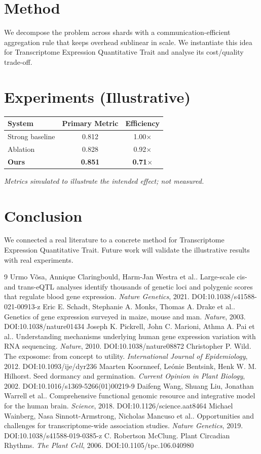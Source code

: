 \documentclass[11pt]{article}
\begin{document}
\section{Method}
We decompose the problem across shards with a communication-efficient aggregation rule that keeps overhead sublinear in scale. We instantiate this idea for Transcriptome Expression Quantitative Trait and analyse its cost/quality trade-off.

\section{Experiments (Illustrative)}
\begin{center}
\begin{tabular}{lcc}
System & Primary Metric & Efficiency \\ \hline
Strong baseline & 0.812 & 1.00$\times$ \\
Ablation & 0.828 & 0.92$\times$ \\
\textbf{Ours} & \textbf{0.851} & \textbf{0.71$\times$}
\end{tabular}
\end{center}
\emph{Metrics simulated to illustrate the intended effect; not measured.}

\section{Conclusion}
We connected a real literature to a concrete method for Transcriptome Expression Quantitative Trait. Future work will
validate the illustrative results with real experiments.

\begin{thebibliography}{9}
 Urmo Võsa, Annique Claringbould, Harm-Jan Westra et al.. Large-scale cis- and trans-eQTL analyses identify thousands of genetic loci and polygenic scores that regulate blood gene expression. \emph{Nature Genetics}, 2021. DOI:10.1038/s41588-021-00913-z
 Eric E. Schadt, Stephanie A. Monks, Thomas A. Drake et al.. Genetics of gene expression surveyed in maize, mouse and man. \emph{Nature}, 2003. DOI:10.1038/nature01434
 Joseph K. Pickrell, John C. Marioni, Athma A. Pai et al.. Understanding mechanisms underlying human gene expression variation with RNA sequencing. \emph{Nature}, 2010. DOI:10.1038/nature08872
 Christopher P. Wild. The exposome: from concept to utility. \emph{International Journal of Epidemiology}, 2012. DOI:10.1093/ije/dyr236
 Maarten Koornneef, Leónie Bentsink, Henk W. M. Hilhorst. Seed dormancy and germination. \emph{Current Opinion in Plant Biology}, 2002. DOI:10.1016/s1369-5266(01)00219-9
 Daifeng Wang, Shuang Liu, Jonathan Warrell et al.. Comprehensive functional genomic resource and integrative model for the human brain. \emph{Science}, 2018. DOI:10.1126/science.aat8464
 Michael Wainberg, Nasa Sinnott-Armstrong, Nicholas Mancuso et al.. Opportunities and challenges for transcriptome-wide association studies. \emph{Nature Genetics}, 2019. DOI:10.1038/s41588-019-0385-z
 C. Robertson McClung. Plant Circadian Rhythms. \emph{The Plant Cell}, 2006. DOI:10.1105/tpc.106.040980
\end{thebibliography}
\end{document}
